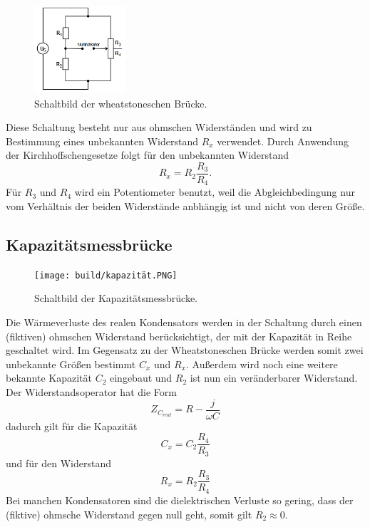 \begin{figure}[H]
    \centering
    \includegraphics[width=0.3\textwidth]{build/wheat.PNG}
    \caption{Schaltbild der wheatstoneschen Brücke.\cite[219]{V302}}
    \label{fig:wheat}
\end{figure}
Diese Schaltung besteht nur aus ohmschen Widerständen und wird zu Bestimmung eines unbekannten Widerstand $R_x$ verwendet.
Durch Anwendung der Kirchhoffschengesetze folgt für den unbekannten Widerstand
\begin{equation}
    R_x = R_2 \frac{R_3}{R_4}.
    \label{eqn:wheat}
\end{equation}
Für $R_3$ und $R_4$ wird ein Potentiometer benutzt, weil die Abgleichbedingung nur vom Verhältnis der beiden Widerstände anbhängig ist und nicht von deren Größe.

\subsection{Kapazitätsmessbrücke}
\label{subsec:kapazitäts}

\begin{figure}[H]
    \centering
    \texttt{[image: build/kapazität.PNG]}
    \caption{Schaltbild der Kapazitätsmessbrücke.\cite[220]{V302}}
    \label{fig:kapazität}
\end{figure}
Die Wärmeverluste des realen Kondensators werden in der Schaltung durch einen (fiktiven) ohmschen Widerstand berücksichtigt, der mit der Kapazität in Reihe geschaltet wird.
Im Gegensatz zu der Wheatstoneschen Brücke werden somit zwei unbekannte Größen bestimmt $C_x$ und $R_x$.
Außerdem wird noch eine weitere bekannte Kapazität $C_2$ eingebaut und $R_2$ ist nun ein veränderbarer Widerstand.
Der Widerstandsoperator hat die Form
\begin{equation}
    Z_{C_{real}} = R - \frac{j}{\omega C}
    \label{eqn:widerop_kap}
\end{equation}
dadurch gilt für die Kapazität
\begin{equation}
    C_x = C_2 \frac{R_4}{R_3}
    \label{eqn:kapazität_kap}
\end{equation}
und für den Widerstand
\begin{equation}
    R_x = R_2 \frac{R_3}{R_4}
    \label{eqn:widerstand_kap}
\end{equation}
Bei manchen Kondensatoren sind die dielektrischen Verluste so gering, dass der (fiktive) ohmsche Widerstand gegen null geht, somit gilt $R_2 \approx 0$.


